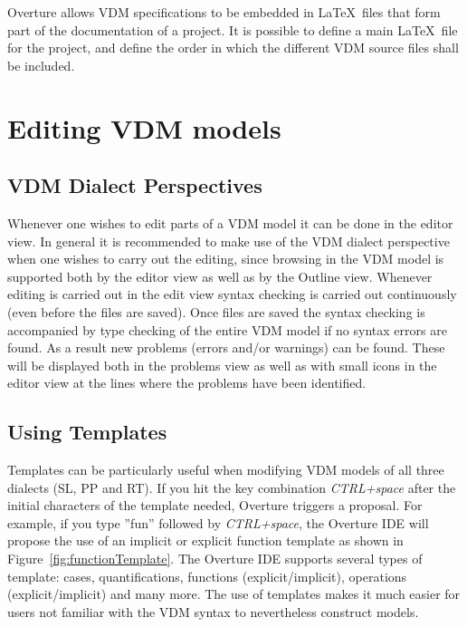\documentclass{overturerepchap}
\begin{document}
Overture allows VDM specifications to be embedded in \LaTeX\ files that
form part of the documentation of a project. It is possible to define
a main \LaTeX\ file for the project, and define the order in which the
different VDM source files shall be included.

\chapter{Editing VDM models}\label{sec:editVDM}

\section{VDM Dialect Perspectives}

Whenever one wishes to edit parts of a VDM model it can be done in the
editor view. In general it is recommended to make use of the VDM
dialect perspective when one wishes to carry out the editing, since
browsing in the VDM model is supported both by the editor view as well
as by the Outline view. Whenever editing is carried out in the edit
view syntax checking is carried out continuously (even before the
files are saved). Once files are saved the syntax checking is
accompanied by type checking of the entire VDM model if no syntax
errors are found. As a result new
problems (errors and/or warnings) can be found. These will be
displayed both in the problems view as well as with small icons in the
editor view at the lines where the problems have been identified.

\section{Using Templates}

Templates can be particularly useful when modifying VDM models of all 
three dialects (SL, PP and RT). If you hit
the key combination \textit{CTRL+space} after the initial characters
of the template needed, Overture triggers a proposal. For example, if
you type ''fun'' followed by \textit{CTRL+space}, the Overture IDE
will propose the use of an implicit or explicit function template as
shown in Figure~\ref{fig:functionTemplate}. The Overture IDE
supports several types of template: cases, quantifications, functions
(explicit/implicit), operations (explicit/implicit) and many
more. The use
of templates makes it much easier for users not familiar
with the VDM syntax to nevertheless construct models.
\end{document}

